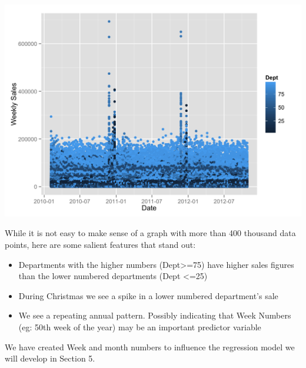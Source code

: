 \documentclass[]{article}
\newenvironment{Shaded}{\begin{snugshade}}{\end{snugshade}}
\newcommand{\KeywordTok}[1]{\textcolor[rgb]{0.13,0.29,0.53}{\textbf{{#1}}}}
\newcommand{\StringTok}[1]{\textcolor[rgb]{0.31,0.60,0.02}{{#1}}}
\newcommand{\NormalTok}[1]{{#1}}
\begin{document}
\includegraphics[scale=.3]{allPoint-1}

While it is not easy to make sense of a graph with more than 400
thousand data points, here are some salient features that stand out:

\begin{itemize}
\itemsep1pt\parskip0pt
\item
  Departments with the higher numbers (Dept\textgreater{}=75) have
  higher sales figures than the lower numbered departments (Dept
  \textless{}=25)
\item
  During Christmas we see a spike in a lower numbered department's sale
\item
  We see a repeating annual pattern. Possibly indicating that Week
  Numbers (eg: 50th week of the year) may be an important predictor
  variable
\end{itemize}

\begin{Shaded}
\end{Shaded}

We have created Week and month numbers to influence the regression model
we will develop in Section 5.
\end{document}

